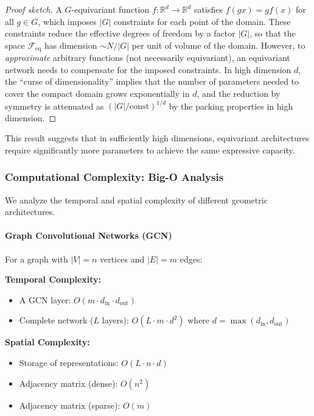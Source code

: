 \begin{proof}[Proof sketch]
A $G$-equivariant function $f: \mathbb{R}^d \to \mathbb{R}^d$ satisfies $f(gx) = gf(x)$ for all $g \in G$, which imposes $|G|$ constraints for each point of the domain. These constraints reduce the effective degrees of freedom by a factor $|G|$, so that the space $\mathcal{F}_{\text{eq}}$ has dimension $\sim N/|G|$ per unit of volume of the domain. However, to \textit{approximate} arbitrary functions (not necessarily equivariant), an equivariant network needs to compensate for the imposed constraints. In high dimension $d$, the ``curse of dimensionality'' implies that the number of parameters needed to cover the compact domain grows exponentially in $d$, and the reduction by symmetry is attenuated as $(|G|/\text{const})^{1/d}$ by the packing properties in high dimension.
\end{proof}

This result suggests that in sufficiently high dimensions, equivariant architectures require significantly more parameters to achieve the same expressive capacity.

\subsubsection{Computational Complexity: Big-O Analysis}

We analyze the temporal and spatial complexity of different geometric architectures.

\paragraph{Graph Convolutional Networks (GCN)}

For a graph with $|V| = n$ vertices and $|E| = m$ edges:

\textbf{Temporal Complexity:}
\begin{itemize}
\item A GCN layer: $O(m \cdot d_{\text{in}} \cdot d_{\text{out}})$
\item Complete network ($L$ layers): $O(L \cdot m \cdot d^2)$ where $d = \max(d_{\text{in}}, d_{\text{out}})$
\end{itemize}

\textbf{Spatial Complexity:}
\begin{itemize}
\item Storage of representations: $O(L \cdot n \cdot d)$
\item Adjacency matrix (dense): $O(n^2)$
\item Adjacency matrix (sparse): $O(m)$
\end{itemize}

